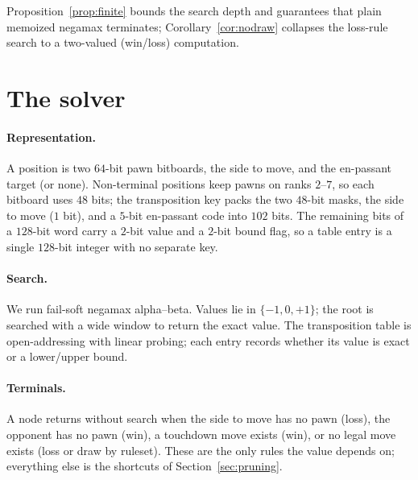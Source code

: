 \documentclass[11pt]{article}
\theoremstyle{plain}
\theoremstyle{definition}
\begin{document}
Proposition~\ref{prop:finite} bounds the search depth and guarantees that plain
memoized negamax terminates; Corollary~\ref{cor:nodraw} collapses the loss-rule
search to a two-valued (win/loss) computation.

\section{The solver}\label{sec:solver}

\paragraph{Representation.} A position is two $64$-bit pawn bitboards, the side to
move, and the en-passant target (or none). Non-terminal positions keep pawns on
ranks $2$--$7$, so each bitboard uses $48$ bits; the transposition key packs the
two $48$-bit masks, the side to move ($1$ bit), and a $5$-bit en-passant code
into $102$ bits. The remaining bits of a $128$-bit word carry a $2$-bit value and
a $2$-bit bound flag, so a table entry is a single $128$-bit integer with no
separate key.

\paragraph{Search.} We run fail-soft negamax alpha--beta. Values lie in
$\{-1,0,+1\}$; the root is searched with a wide window to return the exact value.
The transposition table is open-addressing with linear probing; each entry
records whether its value is exact or a lower/upper bound.

\paragraph{Terminals.} A node returns without search when the side to move has no
pawn (loss), the opponent has no pawn (win), a touchdown move exists (win), or no
legal move exists (loss or draw by ruleset). These are the only rules the value
depends on; everything else is the shortcuts of Section~\ref{sec:pruning}.
\end{document}
